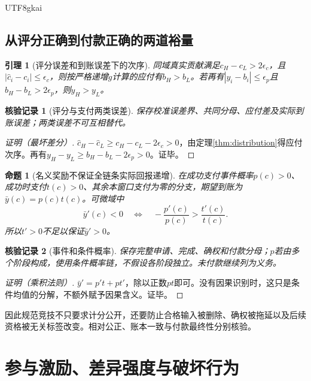 \documentclass[12pt,a4paper,openany]{report}
\newtheorem{lemma}{引理}[chapter]
\newtheorem{proposition}{命题}[chapter]
\newtheorem{Certificate}{核验记录}[chapter]
\begin{document}
\begin{CJK*}{UTF8}{gkai}
\section{从评分正确到付款正确的两道裕量}
\begin{lemma}[评分误差和到账误差下的次序]
\label{lem:payment-margin}
同域真实贡献满足$c_H-c_L>2\epsilon_c$，且$|\widehat c_i-c_i|\le\epsilon_c$，则按严格递增$g$计算的应付有$b_H>b_L$。若再有$|y_i-b_i|\le\epsilon_p$且$b_H-b_L>2\epsilon_p$，则$y_H>y_L$。
\end{lemma}
\begin{Certificate}[评分与支付两类误差]
保存校准误差界、共同分母、应付差及实际到账误差；两类误差不可互相替代。
\end{Certificate}
\begin{proof}[证明（最坏差分）]
$\widehat c_H-\widehat c_L\ge c_H-c_L-2\epsilon_c>0$，由定理\ref{thm:distribution}得应付次序。再有$y_H-y_L\ge b_H-b_L-2\epsilon_p>0$。证毕。
\end{proof}
\begin{proposition}[名义奖励不保证全链条实际回报递增]
\label{prop:transmission}
在成功支付事件概率$p(c)>0$、成功时支付$t(c)>0$、其余本窗口支付为零的分支，期望到账为$\bar y(c)=p(c)t(c)$。可微域中
\[
 \bar y'(c)<0\quad\Longleftrightarrow\quad
 -\frac{p'(c)}{p(c)}>\frac{t'(c)}{t(c)}.
\]
所以$t'>0$不足以保证$\bar y'>0$。
\end{proposition}
\begin{Certificate}[事件和条件概率]
保存完整申请、完成、确权和付款分母；$p$若由多个阶段构成，使用条件概率链，不假设各阶段独立。未付款继续列为义务。
\end{Certificate}
\begin{proof}[证明（乘积法则）]
$\bar y'=p't+pt'$，除以正数$pt$即可。没有因果识别时，这只是条件均值的分解，不额外赋予因果含义。证毕。
\end{proof}
因此规范竞技不只要求计分公开，还要防止合格输入被删除、确权被拖延以及后续资格被无关标签改变。相对公正、账本一致与付款最终性分别核验\cite[“名义奖励被传导下降反转的充要条件”]{SourceSupplement}。

\chapter{参与激励、差异强度与破坏行为}
\label{chap:incentives}

\end{CJK*}
\end{document}
